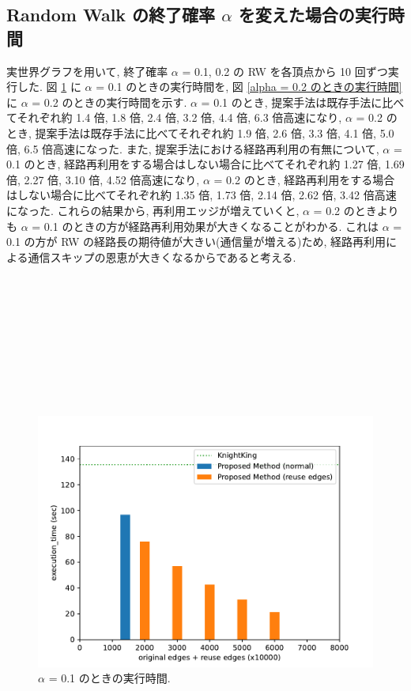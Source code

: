 \subsection{Random Walk の終了確率 $\alpha$ を変えた場合の実行時間}\label{終了確率 alpha を変えた場合の実行時間}

実世界グラフを用いて, 終了確率 $\alpha$ = 0.1, 0.2 の RW を各頂点から 10 回ずつ実行した. 図 \ref{alpha = 0.1 のときの実行時間} に $\alpha$ = 0.1 のときの実行時間を, 図 \ref{alpha = 0.2 のときの実行時間} に $\alpha$ = 0.2 のときの実行時間を示す. $\alpha$ = 0.1 のとき, 提案手法は既存手法に比べてそれぞれ約 1.4 倍, 1.8 倍, 2.4 倍, 3.2 倍, 4.4 倍, 6.3 倍高速になり, $\alpha$ = 0.2 のとき, 提案手法は既存手法に比べてそれぞれ約 1.9 倍, 2.6 倍, 3.3 倍, 4.1 倍, 5.0 倍, 6.5 倍高速になった. また, 提案手法における経路再利用の有無について, $\alpha$ = 0.1 のとき, 経路再利用をする場合はしない場合に比べてそれぞれ約 1.27 倍, 1.69 倍, 2.27 倍, 3.10 倍, 4.52 倍高速になり, $\alpha$ = 0.2 のとき, 経路再利用をする場合はしない場合に比べてそれぞれ約 1.35 倍, 1.73 倍, 2.14 倍, 2.62 倍, 3.42 倍高速になった. これらの結果から, 再利用エッジが増えていくと, $\alpha$ = 0.2 のときよりも $\alpha$ = 0.1 のときの方が経路再利用効果が大きくなることがわかる. これは $\alpha$ = 0.1 の方が RW の経路長の期待値が大きい(通信量が増える)ため, 経路再利用による通信スキップの恩恵が大きくなるからであると考える.
\\
\\
\\
\\
\\
\\
\\
\\
\\
\\

\begin{figure}[t]
    \centering
    \includegraphics[scale=0.8]{figure/AR_cache_alpha_0.1.pdf}
    \caption{$\alpha$ = 0.1 のときの実行時間.}
    \label{alpha = 0.1 のときの実行時間}
\end{figure}

